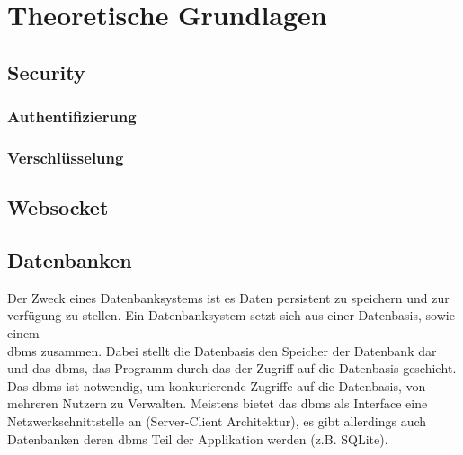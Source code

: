 \chapter{Theoretische Grundlagen}
\section{Security}
\subsection{Authentifizierung}
\subsection{Verschlüsselung}
\section{Websocket}
\section{Datenbanken}
Der Zweck eines Datenbanksystems ist es Daten persistent zu speichern und zur verfügung zu stellen.
Ein Datenbanksystem setzt sich aus einer Datenbasis, sowie einem\\ \ac{dbms} zusammen.
Dabei stellt die Datenbasis den Speicher der Datenbank dar und das \ac{dbms}, 
das Programm durch das der Zugriff auf die Datenbasis geschieht.
Das \ac{dbms} ist notwendig, um konkurierende Zugriffe auf die Datenbasis, von mehreren Nutzern zu Verwalten. \citep{Schubert:2007:3}
Meistens bietet das \ac{dbms} als Interface eine Netzwerkschnittstelle an (Server-Client Architektur), es gibt allerdings auch Datenbanken deren \ac{dbms} Teil der Applikation werden (z.B. SQLite).
